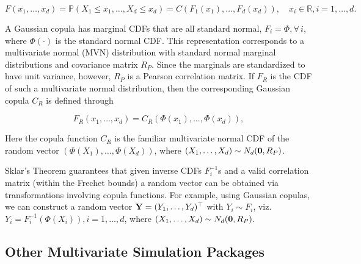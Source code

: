 \documentclass[
]{jss}
\begin{document}
\begin{equation}
F(x_1, \ldots, x_d) = {\mathbb P}(X_1\leq x_1, \ldots,X_d\leq x_d) = C(F_1(x_1), \ldots, F_d(x_d)), \quad x_i \in {\mathbb R}, i=1,\ldots,d.
\label{eq:copula}
\end{equation}

A Gaussian copula has marginal CDFs that are all standard normal, \(F_i = \Phi, \forall \, i\), where \(\Phi(\cdot)\) is the standard normal CDF. This representation corresponds to a multivariate normal (MVN) distribution with standard normal marginal distributions and covariance matrix \(R_P\). Since the marginals are standardized to have unit variance, however, \(R_P\) is a Pearson correlation matrix. If \(F_R\) is the CDF of such a multivariate normal distribution, then the corresponding Gaussian copula \(C_R\) is defined through

\begin{equation}
\label{eq:gauss}
F_R(x_1, \ldots, x_d) = C_R(\Phi(x_1), \ldots, \Phi(x_d)),
\end{equation}

Here the copula function \(C_R\) is the familiar multivariate normal CDF of the random vector \((\Phi(X_1), \ldots, \Phi(X_d))\), where \((X_1, \ldots, X_d) \sim N_d({\bf 0}, R_P)\).

Sklar's Theorem \citep{Sklar1959, Ubeda-Flores2017} guarantees that given inverse CDFs \(F_i^{-1}\)s and a valid correlation matrix (within the Frechet bounds) a random vector can be obtained via transformations involving copula functions. For example, using Gaussian copulas, we can construct a random vector \({\bf Y} = (Y_1, \ldots, Y_d)^\top\) with \(Y_i \sim F_i\), viz. \(Y_i = F_i^{-1}(\Phi(X_i)), i=1, \ldots, d\), where \((X_1, \ldots, X_d) \sim N_d({\bf 0}, R_P)\).

\hypertarget{other-multivariate-simulation-packages}{%
\subsection{Other Multivariate Simulation Packages}\label{other-multivariate-simulation-packages}}
\end{document}
